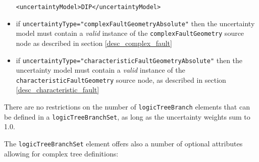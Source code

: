 \begin{itemize}
    \begin{verbatim}
<uncertaintyModel>DIP</uncertaintyModel>
	\end{verbatim}

    \item if \Verb+uncertaintyType="complexFaultGeometryAbsolute"+ then the uncertainty model must contain a \emph{valid} instance of the \verb+complexFaultGeometry+ source node as described in section \ref{desc_complex_fault}
    
    \item if \Verb+uncertaintyType="characteristicFaultGeometryAbsolute"+ then the uncertainty model must contain a \emph{valid} instance of the \verb+characteristicFaultGeometry+ source node, as described in section \ref{desc_characteristic_fault}
\end{itemize}

There are no restrictions on the number of \Verb+logicTreeBranch+ elements
that can be defined in a \Verb+logicTreeBranchSet+, as long as the uncertainty
weights sum to 1.0.

The \Verb+logicTreeBranchSet+ element offers also a number of optional
attributes allowing for complex tree definitions:

